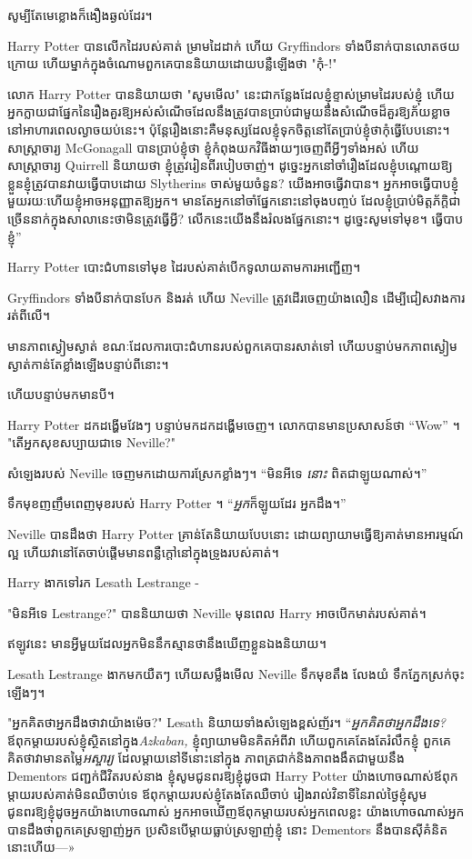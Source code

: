 {{{{សូម្បី​តែ​មេ​ខ្លោង​ក៏​ងឿង​ឆ្ងល់​ដែរ។

Harry Potter បានលើកដៃរបស់គាត់ ម្រាមដៃដាក់ ហើយ Gryffindors ទាំងបីនាក់បានលោតថយក្រោយ ហើយម្នាក់ក្នុងចំណោមពួកគេបាននិយាយដោយបន្លឺឡើងថា "កុំ-!"

លោក Harry Potter បាននិយាយថា "សូមមើល" នេះជាកន្លែងដែលខ្ញុំខ្ទាស់ម្រាមដៃរបស់ខ្ញុំ ហើយអ្នកក្លាយជាផ្នែកនៃរឿងគួរឱ្យអស់សំណើចដែលនឹងត្រូវបានប្រាប់ជាមួយនឹងសំណើចដ៏គួរឱ្យភ័យខ្លាចនៅអាហារពេលល្ងាចយប់នេះ។ ប៉ុន្តែ​រឿង​នោះ​គឺ​មនុស្ស​ដែល​ខ្ញុំ​ទុក​ចិត្ត​នៅ​តែ​ប្រាប់​ខ្ញុំ​ថា​កុំ​ធ្វើ​បែប​នោះ។ សាស្ត្រាចារ្យ McGonagall បានប្រាប់ខ្ញុំថា ខ្ញុំកំពុងយកវិធីងាយៗចេញពីអ្វីៗទាំងអស់ ហើយសាស្រ្តាចារ្យ Quirrell និយាយថា ខ្ញុំត្រូវរៀនពីរបៀបចាញ់។ ដូច្នេះ​អ្នក​នៅ​ចាំ​រឿង​ដែល​ខ្ញុំ​បណ្តោយ​ឱ្យ​ខ្លួន​ខ្ញុំ​ត្រូវ​បាន​វាយ​ធ្វើ​បាប​ដោយ Slytherins ចាស់​មួយ​ចំនួន​? យើងអាចធ្វើវាបាន។ អ្នក​អាច​ធ្វើ​បាប​ខ្ញុំ​មួយ​រយៈ​ហើយ​ខ្ញុំ​អាច​អនុញ្ញាត​ឱ្យ​អ្នក​។ មាន​តែ​អ្នក​នៅ​ចាំ​ផ្នែក​នោះ​នៅ​ចុង​បញ្ចប់ ដែល​ខ្ញុំ​ប្រាប់​មិត្តភ័ក្តិ​ជា​ច្រើន​នាក់​ក្នុង​សាលា​នេះ​ថា​មិន​ត្រូវ​ធ្វើ​អ្វី? លើកនេះយើងនឹងរំលងផ្នែកនោះ។ ដូច្នេះសូមទៅមុខ។ ធ្វើបាបខ្ញុំ”

Harry Potter បោះជំហានទៅមុខ ដៃរបស់គាត់បើកទូលាយតាមការអញ្ជើញ។

Gryffindors ទាំងបីនាក់បានបែក និងរត់ ហើយ Neville ត្រូវដើរចេញយ៉ាងលឿន ដើម្បីជៀសវាងការរត់ពីលើ។

មាន​ភាព​ស្ងៀម​ស្ងាត់ ខណៈ​ដែល​ការ​បោះ​ជំហាន​របស់​ពួក​គេ​បាន​រសាត់​ទៅ ហើយ​បន្ទាប់​មក​ភាព​ស្ងៀម​ស្ងាត់​កាន់​តែ​ខ្លាំង​ឡើង​បន្ទាប់​ពី​នោះ។

ហើយបន្ទាប់មកមានបី។

Harry Potter ដកដង្ហើមវែងៗ បន្ទាប់មកដកដង្ហើមចេញ។ លោក​បាន​មាន​ប្រសាសន៍​ថា “Wow” ។ "តើអ្នកសុខសប្បាយជាទេ Neville?"

សំឡេងរបស់ Neville ចេញមកដោយការស្រែកខ្លាំងៗ។ “មិនអីទេ \emph{នោះ} ពិតជាឡូយណាស់។”

ទឹកមុខញញឹមពេញមុខរបស់ Harry Potter ។ “\emph{អ្នក}ក៏ឡូយដែរ អ្នកដឹង។”

Neville បានដឹងថា Harry Potter គ្រាន់តែនិយាយបែបនោះ ដោយព្យាយាមធ្វើឱ្យគាត់មានអារម្មណ៍ល្អ ហើយវានៅតែចាប់ផ្តើមមានពន្លឺក្តៅនៅក្នុងទ្រូងរបស់គាត់។

Harry ងាកទៅរក Lesath Lestrange -

"មិនអីទេ Lestrange?" បាននិយាយថា Neville មុនពេល Harry អាចបើកមាត់របស់គាត់។

ឥឡូវនេះ មានអ្វីមួយដែលអ្នកមិននឹកស្មានថានឹងឃើញខ្លួនឯងនិយាយ។

Lesath Lestrange ងាកមកយឺតៗ ហើយសម្លឹងមើល Neville ទឹកមុខតឹង លែងយំ ទឹកភ្នែកស្រក់ចុះឡើងៗ។

"អ្នកគិតថាអ្នកដឹងថាវាយ៉ាងម៉េច?" Lesath និយាយ​ទាំង​សំឡេង​ខ្ពស់​ញ័រ។ “\emph{អ្នកគិតថាអ្នកដឹងទេ?} ឪពុកម្តាយរបស់ខ្ញុំស្ថិតនៅក្នុង\emph{Azkaban,} ខ្ញុំព្យាយាមមិនគិតអំពីវា ហើយពួកគេតែងតែរំលឹកខ្ញុំ ពួកគេគិតថាវាមានតម្លៃ\emph{អស្ចារ្យ} ដែលម្តាយនៅទីនោះនៅក្នុង ភាពត្រជាក់និងភាពងងឹតជាមួយនឹង Dementors ជញ្ជក់ជីវិតរបស់នាង ខ្ញុំសូមជូនពរឱ្យខ្ញុំដូចជា Harry Potter យ៉ាងហោចណាស់ឪពុកម្តាយរបស់គាត់មិនឈឺចាប់ទេ ឪពុកម្តាយរបស់ខ្ញុំតែងតែឈឺចាប់ រៀងរាល់វិនាទីនៃរាល់ថ្ងៃខ្ញុំសូមជូនពរឱ្យខ្ញុំដូចអ្នកយ៉ាងហោចណាស់ អ្នក​អាច​ឃើញ​ឪពុកម្ដាយ​របស់​អ្នក​ពេល​ខ្លះ យ៉ាង​ហោច​ណាស់​អ្នក​បាន​ដឹង​ថា​ពួកគេ​ស្រឡាញ់​អ្នក ប្រសិនបើ​ម្ដាយ​ធ្លាប់​ស្រឡាញ់​ខ្ញុំ នោះ Dementors នឹង​បាន​ស៊ី​គំនិត​នោះ​ហើយ—»

}}}}
